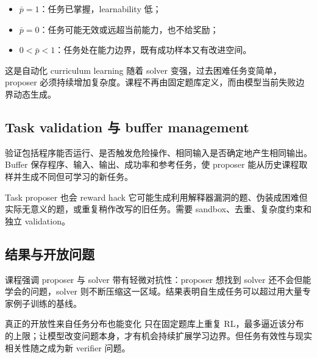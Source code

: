\documentclass[a4paper]{article}
\begin{document}
\begin{itemize}
    \item $\bar p=1$：任务已掌握，learnability 低；
    \item $\bar p=0$：任务可能无效或远超当前能力，也不给奖励；
    \item $0<\bar p<1$：任务处在能力边界，既有成功样本又有改进空间。
\end{itemize}

\begin{knowledgebox}{这是自动化 curriculum learning}
随着 solver 变强，过去困难任务变简单，proposer 必须持续增加复杂度。课程不再由固定题库定义，而由模型当前失败边界动态生成。
\end{knowledgebox}

\subsection{Task validation 与 buffer management}


验证包括程序能否运行、是否触发危险操作、相同输入是否确定地产生相同输出。Buffer 保存程序、输入、输出、成功率和参考任务，使 proposer 能从历史课程取样并生成不同但可学习的新任务。

\begin{warningbox}{Task proposer 也会 reward hack}
它可能生成利用解释器漏洞的题、伪装成困难但实际无意义的题，或重复稍作改写的旧任务。需要 sandbox、去重、复杂度约束和独立 validation。
\end{warningbox}

\subsection{结果与开放问题}


课程强调 proposer 与 solver 带有轻微对抗性：proposer 想找到 solver 还不会但能学会的问题，solver 则不断压缩这一区域。结果表明自生成任务可以超过用大量专家例子训练的基线。

\begin{importantbox}{真正的开放性来自任务分布也能变化}
只在固定题库上重复 RL，最多逼近该分布的上限；让模型改变问题本身，才有机会持续扩展学习边界。但任务有效性与现实相关性随之成为新 verifier 问题。
\end{importantbox}
\end{document}
